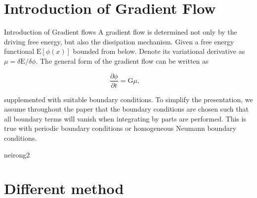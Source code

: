 \documentclass{beamer}
\begin{document}
\section{Introduction of Gradient Flow}
    \begin{frame}{Introduction of Gradient flows}
        A gradient flow is determined not only by the driving free energy, but also the dissipation mechanism. Given a free energy functional $\mathrm{E}[\phi(x)]$ bounded from below. Denote its variational derivative as $\mu=\delta\mathrm{E}/\delta \phi$. The general form of the gradient flow can be written as

\begin{equation}\label{GFlow}
  \frac{\partial\phi}{\partial t} = \mathrm{G}\mu ,\quad
\end{equation}

        supplemented with suitable boundary conditions. To simplify the presentation, we assume throughout the paper that the boundary conditions are chosen such that all boundary terms will vanish when integrating by parts are performed. This is true with periodic boundary conditions or homogeneous Neumann boundary conditions.

    \end{frame}
    \begin{frame}

        neirong2

    \end{frame}

\section{Different method}
\end{document}

